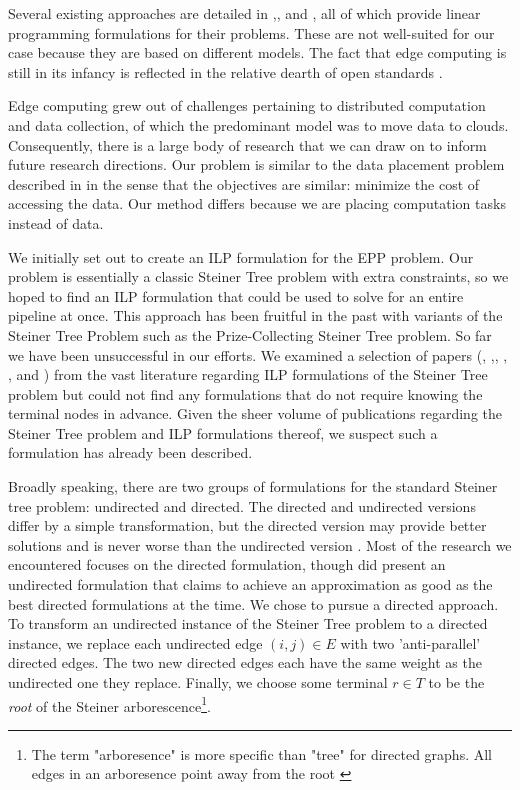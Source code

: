 \documentclass[conference]{IEEEtran}
\begin{document}
    Several existing approaches are detailed in \cite{agarwal2016efficient},\cite{zeng2016joint}, and \cite{Amadeo19}, all of which provide linear programming formulations for their problems. These are not well-suited for our case because they are based on different models. The fact that edge computing is still in its infancy is reflected in the relative dearth of open standards \cite{mouradian18}.
    
    Edge computing grew out of challenges pertaining to distributed computation and data collection, of which the predominant model was to move data to clouds. Consequently, there is a large body of research that we can draw on to inform future research directions. Our problem is similar to the data placement problem described in \cite{MazumdarSomnath2019Asod} in the sense that the objectives are similar: minimize the cost of accessing the data. Our method differs because we are placing computation tasks instead of data.
    
    We initially set out to create an ILP formulation for the EPP problem. Our problem is essentially a classic Steiner Tree problem with extra constraints, so we hoped to find an ILP formulation that could be used to solve for an entire pipeline at once. This approach has been fruitful in the past with variants of the Steiner Tree Problem such as the Prize-Collecting Steiner Tree problem. So far we have been unsuccessful in our efforts.  We examined a selection of papers (\cite{Aneja1980AnIL}, \cite{Goemans1993ACO},\cite{Koch1998SolvingST}, \cite{Ljubic2005SolvingTP}, \cite{brandstater15}, and \cite{haouari2010strength}) from the vast literature regarding ILP formulations of the Steiner Tree problem but could not find any formulations that do not require knowing the terminal nodes in advance. Given the sheer volume of publications regarding the Steiner Tree problem and ILP formulations thereof, we suspect such a formulation has already been described.

 	Broadly speaking, there are two groups of formulations for the standard Steiner tree problem: undirected and directed. The directed and undirected versions differ by a simple transformation, but the directed version may provide better solutions and is never worse than the undirected version \cite{rao1988steiner}. Most of the research we encountered focuses on the directed formulation, though \cite{Goemans1993ACO} did present an undirected formulation that claims to achieve an approximation as good as the best directed formulations at the time. We chose to pursue a directed approach.
 	To transform an undirected instance of the Steiner Tree problem to a directed instance, we replace each undirected edge $(i,j) \in E$ with two 'anti-parallel' directed edges. The two new directed edges each have the same weight as the undirected one they replace. Finally, we choose some terminal $r \in T$ to be the \textit{root} of the Steiner arborescence\footnote{The term "arboresence" is more specific than "tree" for directed graphs. All edges in an arboresence point away from the root \cite{bondy1976graph}}. 
 	
\end{document}
